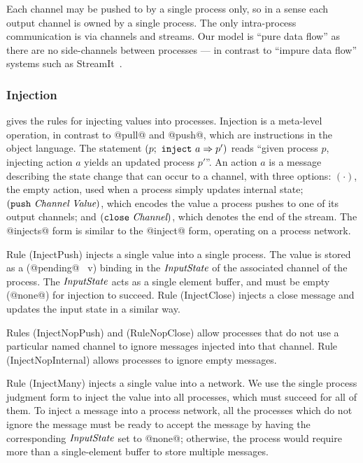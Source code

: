 Each channel may be pushed to by a single process only, so in a sense each output channel is owned by a single process.
The only intra-process communication is via channels and streams.
Our model is ``pure data flow'' as there are no side-channels between processes --- in contrast to ``impure data flow'' systems such as StreamIt~\cite{thies2002streamit}.



\subsubsection{Injection}
 gives the rules for injecting values into processes.
Injection is a meta-level operation, in contrast to @pull@ and @push@, which are instructions in the object language.
The statement $(p;~\texttt{inject}~a \Rightarrow p')$ reads ``given process $p$, injecting action $a$ yields an updated process $p'$''.
An action $a$ is a message describing the state change that can occur to a channel, with three options: $(\cdot)$, the empty action, used when a process simply updates internal state; $(\texttt{push}~\textit{Channel}~\textit{Value})$, which encodes the value a process pushes to one of its output channels; and $(\texttt{close}~\textit{Channel})$, which denotes the end of the stream.
The @injects@ form is similar to the @inject@ form, operating on a process network.

Rule (InjectPush) injects a single value into a single process. The value is stored as a (@pending@~ v) binding in the $\textit{InputState}$ of the associated channel of the process. The $\textit{InputState}$ acts as a single element buffer, and must be empty (@none@) for injection to succeed.
Rule (InjectClose) injects a close message and updates the input state in a similar way.

Rules (InjectNopPush) and (RuleNopClose) allow processes that do not use a particular named channel to ignore messages injected into that channel.
Rule (InjectNopInternal) allows processes to ignore empty messages.

Rule (InjectMany) injects a single value into a network.
We use the single process judgment form to inject the value into all processes, which must succeed for all of them.
To inject a message into a process network, all the processes which do not ignore the message must be ready to accept the message by having the corresponding $\textit{InputState}$ set to @none@; otherwise, the process would require more than a single-element buffer to store multiple messages.


